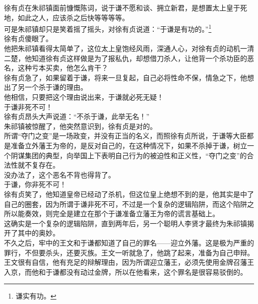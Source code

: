 \begin{multicols}{\theparacolNo}
徐有贞在朱祁镇面前慷慨陈词，说于谦不愿和谈、拥立新君，是想置太上皇于死地，如此之人，应该杀之后快等等等等。\\

可是朱祁镇却只是笑着摇了摇头，对徐有贞说道：“于谦是有功的。”\footnote{谦实有功。}\\

徐有贞傻眼了。\\

他把朱祁镇看得太简单了，这位太上皇饱经风雨，深通人心，对徐有贞的动机一清二楚，他知道徐有贞这样做是为了报私仇，却想借刀杀人，让他背一个杀功臣的恶名，这种亏本买卖，他怎么肯干？\\

徐有贞急了，如果留着于谦，将来一旦复起，自己必将性命不保，情急之下，他想出了另一个杀于谦的理由。\\

他相信，只要把这个理由说出来，于谦就必死无疑！\\

于谦非死不可！\\

徐有贞昂头大声说道：“不杀于谦，此举无名！”\\

朱祁镇被惊醒了，他突然意识到，徐有贞是对的。\\

所谓“夺门之变”是一场政变，并没有正当的名义，而照徐有贞所说，于谦等大臣都是准备立外藩王为帝的，是反对自己的，在这种情况下，如果不杀掉于谦，树立一个阴谋集团的典型，向举国上下表明自己行为的被迫性和正义性，“夺门之变”的合法性就不复存在。\\

没办法了，这个恶名不背也得背了。\\

于谦，你非死不可！\\

徐有贞笑了，他知道皇帝已经动了杀机，但这位皇上绝想不到的是，他其实是中了自己的圈套，因为所谓于谦非死不可，不过是一个复杂的逻辑陷阱，而这个陷阱之所以能奏效，则完全是建立在那个于谦准备立藩王为帝的谎言基础上。\\

这确实是一个复杂的逻辑陷阱，直到两年后，另一个聪明人李贤才最终为朱祁镇揭开了其中的奥妙。\\

不久之后，牢中的王文和于谦都知道了自己的罪名——迎立外藩。这是极为严重的罪行，不但要杀头，还要灭族。王文一听就急了，他跳了起来，准备为自己申辩。\\

王文很有自信，他有充足的辩解理由，因为所谓迎立藩王，必须先使用金牌召藩王入京，而他和于谦都没有动过金牌，所以在他看来，这个罪名是很容易驳倒的。\\


\end{multicols}
